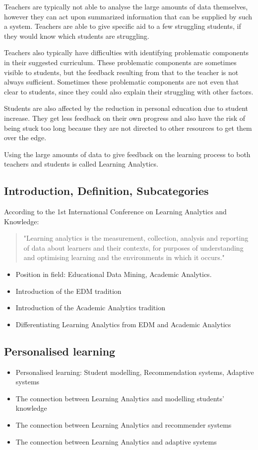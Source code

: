 \documentclass[10pt]{article}
\begin{document}
Teachers are typically not able to analyse the large amounts of data themselves, however they can act upon summarized information that can be supplied by such a system. Teachers are able to give specific aid to a few struggling students, if they would know which students are struggling.

Teachers also typically have difficulties with identifying problematic components in their suggested curriculum. These problematic components are sometimes visible to students, but the feedback resulting from that to the teacher is not always sufficient. Sometimes these problematic components are not even that clear to students, since they could also explain their struggling with other factors.

Students are also affected by the reduction in personal education due to student increase. They get less feedback on their own progress and also have the risk of being stuck too long because they are not directed to other resources to get them over the edge.

Using the large amounts of data to give feedback on the learning process to both teachers and students is called Learning Analytics.

\subsection{Introduction, Definition, Subcategories}
According to the 1st International Conference on Learning Analytics and Knowledge\cite{lak2011}:
\begin{quote}
"Learning analytics is the measurement, collection, analysis and reporting of data about learners and their contexts, for purposes of understanding and optimising learning and the environments in which it occurs."
\end{quote}

\cite{Ferguson2012a} \cite{Greller2012}
\begin{itemize}
\item Position in field: Educational Data Mining, Academic Analytics.
\item Introduction of the EDM tradition
\item Introduction of the Academic Analytics tradition
\item Differentiating Learning Analytics from EDM and Academic Analytics
\end{itemize}
\subsection{Personalised learning}
\begin{itemize}
\item Personalised learning: Student modelling, Recommendation systems, Adaptive systems
\item The connection between Learning Analytics and modelling students’ knowledge
\item The connection between Learning Analytics and recommender systems
\item The connection between Learning Analytics and adaptive systems
\end{itemize}
\end{document}
